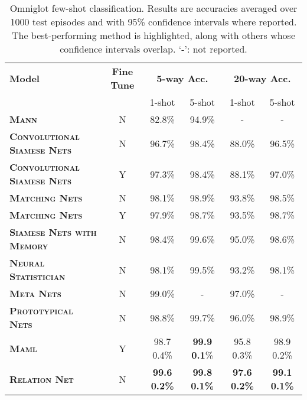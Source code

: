 \documentclass[10pt,twocolumn,letterpaper]{article}
\begin{document}
\begin{table*}[t]
\centering
\footnotesize
\begin{tabular}{@{} lccccc @{}}
\toprule
\multirow{2}{*}{\bf Model} & \multirow{2}{*}{\bf Fine Tune} &\multicolumn{2}{c}{\multirow{2}{*}{\bf 5-way Acc.}} &\multicolumn{2}{c}{\multirow{2}{*}{\bf 20-way Acc.}}\\
& \multicolumn{2}{c}{} & \multicolumn{2}{c}{} \\
& & 1-shot & 5-shot & 1-shot &5-shot  \\
\midrule 

\textbf{\textsc{Mann}} \cite{santoro2016meta} & N  & 82.8\% & 94.9\% & - &- \\
\textbf{\textsc{Convolutional} \textsc{Siamese} \textsc{Nets}} \cite{koch2015siamese}& N  &96.7\% &98.4\% &88.0\% &96.5\% \\ 
\textbf{\textsc{Convolutional} \textsc{Siamese} \textsc{Nets}} \cite{koch2015siamese}& Y  &97.3\% &98.4\% &88.1\% &97.0\% \\ 
\textbf{\textsc{Matching} \textsc{Nets}} \cite{vinyals2016matching}& N & 98.1\% & 98.9\% &93.8\% & 98.5\% \\
\textbf{\textsc{Matching} \textsc{Nets}} \cite{vinyals2016matching}& Y &97.9\% &98.7\% &93.5\% &98.7\% \\ 
\textbf{\textsc{Siamese} \textsc{Nets} \textsc{with} \textsc{Memory}} \cite{kaiser2017learning}&N&98.4\% &99.6\% &95.0\% &98.6\% \\
\textbf{\textsc{Neural} \textsc{Statistician}} \cite{edwards2016towards}&  N& 98.1\%& 99.5\%& 93.2\% &  98.1\%\\ 
\textbf{\textsc{Meta} \textsc{Nets}} \cite{munkhdalai2017meta}& N &99.0\% & - & 97.0\% & -\\ 
\textbf{\textsc{Prototypical} \textsc{Nets}} \cite{snell2017prototypical}&N  &98.8\% &99.7\%  &96.0\% &98.9\% \\ 
\textbf{\textsc{Maml}} \cite{finn2017model}& Y &98.7  0.4\% &\textbf{99.9  0.1}\% &95.8  0.3\% &98.9  0.2\% \\ 
\midrule
\textbf{\textsc{Relation} \textsc{Net}}&N& \textbf{99.6  0.2\%} &\textbf{99.8 0.1\%} &\textbf{97.6  0.2\%} &\textbf{99.1 0.1\%}\\ 
\bottomrule
\end{tabular}
\caption{\small 
Omniglot few-shot classification. Results are accuracies averaged over 1000 test episodes and with 95\% confidence intervals where reported. The best-performing method is highlighted, along with others whose confidence intervals overlap. `-': not reported.
}
\label{tab:omni}
\vspace{-1em}
\end{table*}
\end{document}

